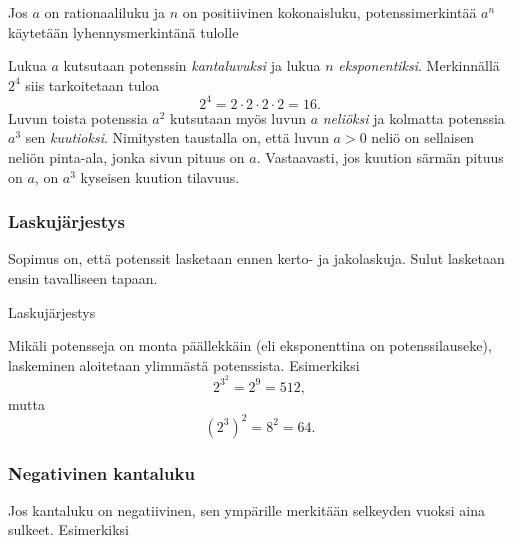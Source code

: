 Jos $a$ on rationaaliluku ja $n$ on positiivinen kokonaisluku, potenssimerkintää $a^n$ käytetään lyhennysmerkintänä tulolle
   
\laatikko{    \[
        a^n = \underbrace{a\cdot \ldots \cdot a}_{n\text{ kpl}}. 
    \]}
    
Lukua $a$ kutsutaan potenssin \emph{kantaluvuksi} ja lukua $n$ \emph{eksponentiksi}. Merkinnällä $2^4$ siis tarkoitetaan tuloa 
        \[
            2^4=2\cdot 2\cdot 2\cdot 2=16.
        \]
Luvun toista potenssia $a^2$ kutsutaan myös luvun $a$ \emph{neliöksi} ja kolmatta potenssia $a^3$ sen \emph{kuutioksi}. Nimitysten taustalla on,
että luvun $a>0$ neliö on sellaisen neliön pinta-ala, jonka sivun pituus on $a$. Vastaavasti, jos kuution särmän pituus on $a$, on $a^3$ kyseisen kuution tilavuus.  

\subsubsection*{Laskujärjestys}

Sopimus on, että potenssit lasketaan ennen kerto- ja jakolaskuja. Sulut lasketaan ensin tavalliseen tapaan.

    \begin{esimerkki}
      Laskujärjestys
        \begin{alakohdat}
        \end{alakohdat}
    \end{esimerkki}  

Mikäli potensseja on monta päällekkäin (eli eksponenttina on potenssilauseke),
laskeminen aloitetaan ylimmästä potenssista. Esimerkiksi
\[2^{3^2}= 2^9 = 512, \]
mutta
\[(2^3)^2=8^2=64. \]

   
%  

\subsubsection*{Negativinen kantaluku}

Jos kantaluku on negatiivinen, sen ympärille merkitään selkeyden vuoksi
aina sulkeet. Esimerkiksi

